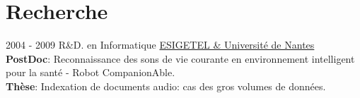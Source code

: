 \documentclass[letterpaper]{twentysecondcv} %
\begin{document}
\section{Recherche}
\begin{twenty}
	\twentyitem
    	{2004 - 2009}
		{}
        {R\&D. en Informatique}
        {\href{https://www.univ-nantes.fr/}{ESIGETEL \& Université de Nantes}}
        {}
	       {
	        \textbf{PostDoc}: Reconnaissance des sons de vie courante en environnement intelligent pour la santé - Robot CompanionAble. \\
	       	\textbf{Thèse}: Indexation de documents audio: cas des gros volumes de données.
	        {
			}
	       }
  
\end{twenty}
\end{document}
